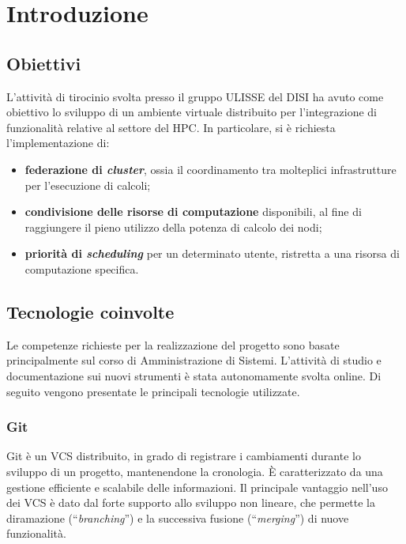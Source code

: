 \documentclass[12pt,a4paper,twoside,openright]{book}
\begin{document}
\tableofcontents

\chapter{\textbf{Introduzione}} %
\section{Obiettivi}
L'attività di tirocinio svolta presso il gruppo \ac{ULISSE} del \ac{DISI} ha avuto come obiettivo lo sviluppo di un ambiente virtuale distribuito per l'integrazione di funzionalità relative al settore del \ac{HPC}. In particolare, si è richiesta l'implementazione di:
\begin{itemize}
    \item \textbf{federazione di \textit{cluster}}, ossia il coordinamento tra molteplici infrastrutture per l'esecuzione di calcoli;
    \item \textbf{condivisione delle risorse di computazione} disponibili, al fine di raggiungere il pieno utilizzo della potenza di calcolo dei nodi;
    \item \textbf{priorità di \textit{scheduling}} per un determinato utente, ristretta a una risorsa di computazione specifica.
\end{itemize}

\section{Tecnologie coinvolte}
Le competenze richieste per la realizzazione del progetto sono basate principalmente sul corso di Amministrazione di Sistemi. L'attività di studio e documentazione sui nuovi strumenti è stata autonomamente svolta online. Di seguito vengono presentate le principali tecnologie utilizzate.

\subsection{Git}
Git è un \ac{VCS} distribuito, in grado di registrare i cambiamenti durante lo sviluppo di un progetto, mantenendone la cronologia. È caratterizzato da una gestione efficiente e scalabile delle informazioni. Il principale vantaggio nell'uso dei \ac{VCS} è dato dal forte supporto allo sviluppo non lineare, che permette la diramazione (``\textit{branching}'') e la successiva fusione (``\textit{merging}'') di nuove funzionalità.
\end{document}
